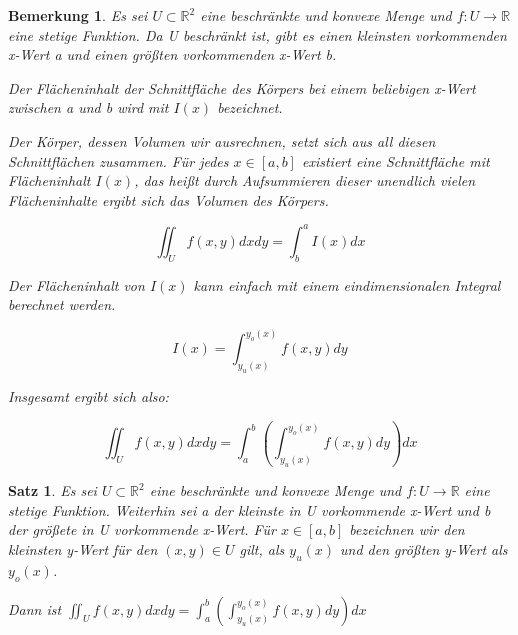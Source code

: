 \documentclass[fontset=ubuntu,12pt,a4paper]{scrreprt}
\newtheorem{bemerkung}[defi]{Bemerkung}
\newtheorem{satz}[defi]{Satz}
\begin{document}
    \begin{bemerkung}

        Es sei \(U\subset\mathbb{R}^2\) eine beschränkte und konvexe Menge und \(f:U\to\mathbb{R}\) eine stetige Funktion. Da U beschränkt ist, gibt es einen kleinsten vorkommenden x-Wert a und einen größten vorkommenden x-Wert b.

        Der Flächeninhalt der Schnittfläche des Körpers bei einem beliebigen x-Wert zwischen a und b wird mit \(I(x)\) bezeichnet.

        Der Körper, dessen Volumen wir ausrechnen, setzt sich aus all diesen Schnittflächen zusammen. Für jedes \(x\in [a,b]\) existiert eine Schnittfläche mit Flächeninhalt \(I(x)\), das heißt durch Aufsummieren dieser unendlich vielen Flächeninhalte ergibt sich das Volumen des Körpers.

        \[\iint_U f(x,y)dxdy = \int^a_b I(x)dx\]

        Der Flächeninhalt von \(I(x)\) kann einfach mit einem eindimensionalen Integral berechnet werden.

        \[I(x) = \int^{y_o(x)}_{y_u(x)} f(x,y)dy \]

        Insgesamt ergibt sich also:

        \[\iint_U f(x,y)dxdy = \int^b_a \left(\int^{y_o(x)}_{y_u(x)} f(x,y)dy\right)dx\]
    \end{bemerkung}

    \begin{satz}
        Es sei \(U\subset\mathbb{R}^2\) eine beschränkte und konvexe Menge und \(f:U\to\mathbb{R}\) eine stetige Funktion. Weiterhin sei a der kleinste in U vorkommende x-Wert und b der größete in U vorkommende x-Wert. Für \(x\in [a,b]\) bezeichnen wir den kleinsten y-Wert für den \((x,y) \in U\) gilt, als \(y_u(x)\) und den größten y-Wert als \(y_o(x)\).

        Dann ist \(\iint_U f(x,y)dxdy = \int^b_a \left(\int^{y_o(x)}_{y_u(x)} f(x,y)dy\right)dx\)
    \end{satz}
\end{document}

